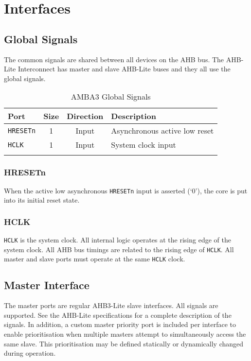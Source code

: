\chapter{Interfaces}\label{interfaces}


\section{Global Signals}\label{global-signals}

The common signals are shared between all devices on the AHB bus. The
AHB-Lite Interconnect has master and slave AHB-Lite buses and they all
use the global signals.

\begin{longtable}[]{@{}lccl@{}}
\toprule
Port & Size & Direction & Description\tabularnewline
\midrule
\endhead
\texttt{HRESETn} & 1 & Input & Asynchronous active low reset\tabularnewline
\texttt{HCLK} & 1 & Input & System clock input\tabularnewline
\bottomrule
\caption{AMBA3 Global Signals}
\end{longtable}

\subsection{HRESETn}\label{hresetn}

When the active low asynchronous \texttt{HRESETn} input is asserted (`0'), the
core is put into its initial reset state.

\subsection{HCLK}\label{hclk}

\texttt{HCLK} is the system clock. All internal logic operates at the rising edge
of the system clock. All AHB bus timings are related to the rising edge
of \texttt{HCLK}. All master and slave ports must operate at the same \texttt{HCLK} clock.

\section{Master Interface}\label{master-interface}

The master ports are regular AHB3-Lite slave interfaces. All signals are
supported. See the AHB-Lite specifications for a complete description of
the signals. In addition, a custom master priority port is included per interface to enable
prioritisation when multiple masters attempt to simultaneously access the same slave. This
prioritisation may be defined statically or dynamically changed during operation.

